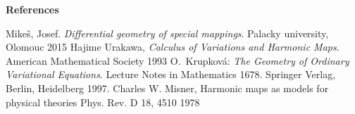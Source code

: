 \documentclass[english]{article}
\begin{document}
\begin{center}
{\bf References}
\end{center}

\begin{thebibliography}{10}
 Mikeš, Josef. \emph{Differential geometry of special mappings}. Palacky university, Olomouc 2015
 Hajime Urakawa, \emph{Calculus of Variations and Harmonic Maps}. American Mathematical Society 1993
O.~Krupková: \emph{The Geometry of Ordinary Variational Equations}.
Lecture Notes in Mathematics 1678. Springer Verlag, Berlin,
Heidelberg 1997.
Charles W. Misner,
Harmonic maps as models for physical theories
Phys. Rev. D 18, 4510  1978
\end{thebibliography}
\end{document}
